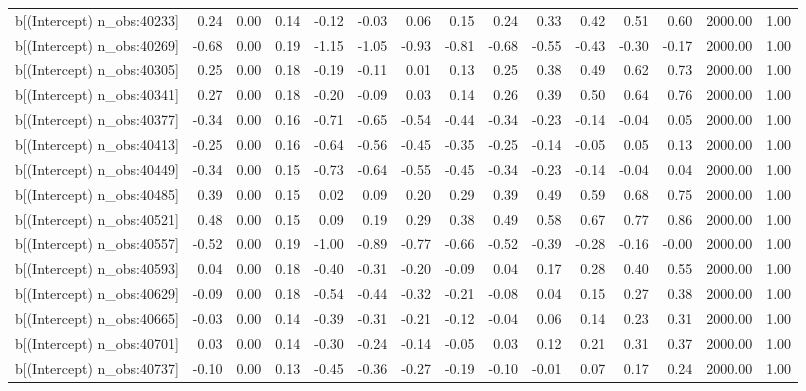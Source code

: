 \begin{table}[ht]
\begin{tabular}{rrrrrrrrrrrrrrr}
  b[(Intercept) n\_obs:40233] & 0.24 & 0.00 & 0.14 & -0.12 & -0.03 & 0.06 & 0.15 & 0.24 & 0.33 & 0.42 & 0.51 & 0.60 & 2000.00 & 1.00 \\ 
  b[(Intercept) n\_obs:40269] & -0.68 & 0.00 & 0.19 & -1.15 & -1.05 & -0.93 & -0.81 & -0.68 & -0.55 & -0.43 & -0.30 & -0.17 & 2000.00 & 1.00 \\ 
  b[(Intercept) n\_obs:40305] & 0.25 & 0.00 & 0.18 & -0.19 & -0.11 & 0.01 & 0.13 & 0.25 & 0.38 & 0.49 & 0.62 & 0.73 & 2000.00 & 1.00 \\ 
  b[(Intercept) n\_obs:40341] & 0.27 & 0.00 & 0.18 & -0.20 & -0.09 & 0.03 & 0.14 & 0.26 & 0.39 & 0.50 & 0.64 & 0.76 & 2000.00 & 1.00 \\ 
  b[(Intercept) n\_obs:40377] & -0.34 & 0.00 & 0.16 & -0.71 & -0.65 & -0.54 & -0.44 & -0.34 & -0.23 & -0.14 & -0.04 & 0.05 & 2000.00 & 1.00 \\ 
  b[(Intercept) n\_obs:40413] & -0.25 & 0.00 & 0.16 & -0.64 & -0.56 & -0.45 & -0.35 & -0.25 & -0.14 & -0.05 & 0.05 & 0.13 & 2000.00 & 1.00 \\ 
  b[(Intercept) n\_obs:40449] & -0.34 & 0.00 & 0.15 & -0.73 & -0.64 & -0.55 & -0.45 & -0.34 & -0.23 & -0.14 & -0.04 & 0.04 & 2000.00 & 1.00 \\ 
  b[(Intercept) n\_obs:40485] & 0.39 & 0.00 & 0.15 & 0.02 & 0.09 & 0.20 & 0.29 & 0.39 & 0.49 & 0.59 & 0.68 & 0.75 & 2000.00 & 1.00 \\ 
  b[(Intercept) n\_obs:40521] & 0.48 & 0.00 & 0.15 & 0.09 & 0.19 & 0.29 & 0.38 & 0.49 & 0.58 & 0.67 & 0.77 & 0.86 & 2000.00 & 1.00 \\ 
  b[(Intercept) n\_obs:40557] & -0.52 & 0.00 & 0.19 & -1.00 & -0.89 & -0.77 & -0.66 & -0.52 & -0.39 & -0.28 & -0.16 & -0.00 & 2000.00 & 1.00 \\ 
  b[(Intercept) n\_obs:40593] & 0.04 & 0.00 & 0.18 & -0.40 & -0.31 & -0.20 & -0.09 & 0.04 & 0.17 & 0.28 & 0.40 & 0.55 & 2000.00 & 1.00 \\ 
  b[(Intercept) n\_obs:40629] & -0.09 & 0.00 & 0.18 & -0.54 & -0.44 & -0.32 & -0.21 & -0.08 & 0.04 & 0.15 & 0.27 & 0.38 & 2000.00 & 1.00 \\ 
  b[(Intercept) n\_obs:40665] & -0.03 & 0.00 & 0.14 & -0.39 & -0.31 & -0.21 & -0.12 & -0.04 & 0.06 & 0.14 & 0.23 & 0.31 & 2000.00 & 1.00 \\ 
  b[(Intercept) n\_obs:40701] & 0.03 & 0.00 & 0.14 & -0.30 & -0.24 & -0.14 & -0.05 & 0.03 & 0.12 & 0.21 & 0.31 & 0.37 & 2000.00 & 1.00 \\ 
  b[(Intercept) n\_obs:40737] & -0.10 & 0.00 & 0.13 & -0.45 & -0.36 & -0.27 & -0.19 & -0.10 & -0.01 & 0.07 & 0.17 & 0.24 & 2000.00 & 1.00 \\ 

\end{tabular}
\end{table}
